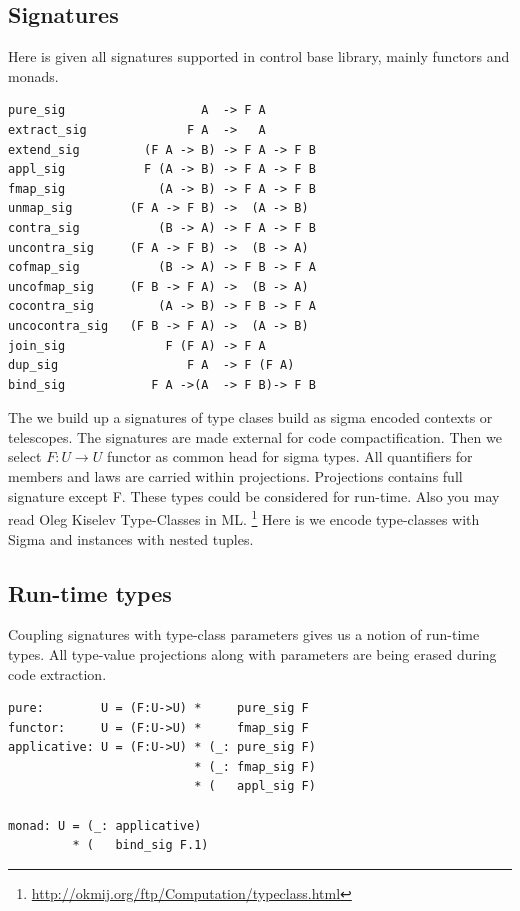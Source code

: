 \documentclass{article}
\begin{document}
\subsection{Signatures}

Here is given all signatures supported in control base library, mainly functors and monads.

\begin{lstlisting}[mathescape=true]
pure_sig                   A  -> F A
extract_sig              F A  ->   A
extend_sig         (F A -> B) -> F A -> F B
appl_sig           F (A -> B) -> F A -> F B
fmap_sig             (A -> B) -> F A -> F B
unmap_sig        (F A -> F B) ->  (A -> B)
contra_sig           (B -> A) -> F A -> F B
uncontra_sig     (F A -> F B) ->  (B -> A)
cofmap_sig           (B -> A) -> F B -> F A
uncofmap_sig     (F B -> F A) ->  (B -> A)
cocontra_sig         (A -> B) -> F B -> F A
uncocontra_sig   (F B -> F A) ->  (A -> B)
join_sig              F (F A) -> F A
dup_sig                  F A  -> F (F A)
bind_sig            F A ->(A  -> F B)-> F B
\end{lstlisting}

The we build up a signatures of type clases build as sigma encoded contexts or telescopes.
The signatures are made external for code compactification.
Then we select $F: U \rightarrow U$ functor as common head for sigma types.
All quantifiers for members and laws are carried within projections.
Projections contains full signature except F. These types could be considered for run-time.
Also you may read Oleg Kiselev Type-Classes in ML. \footnote{\url{http://okmij.org/ftp/Computation/typeclass.html}}
Here is we encode type-classes with Sigma and instances with nested tuples.

\newpage
\subsection{Run-time types}

Coupling signatures with type-class parameters gives us a notion of run-time types.
All type-value projections along with parameters are being erased during code extraction.

\begin{lstlisting}[mathescape=true]
pure:        U = (F:U->U) *     pure_sig F
functor:     U = (F:U->U) *     fmap_sig F
applicative: U = (F:U->U) * (_: pure_sig F)
                          * (_: fmap_sig F)
                          * (   appl_sig F)

monad: U = (_: applicative)
         * (   bind_sig F.1)
\end{lstlisting}
\end{document}
